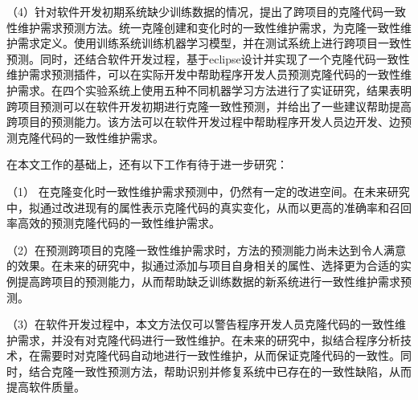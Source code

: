 （4）针对软件开发初期系统缺少训练数据的情况，提出了跨项目的克隆代码一致性维护需求预测方法。统一克隆创建和变化时的一致性维护需求，为克隆一致性维护需求定义。使用训练系统训练机器学习模型，并在测试系统上进行跨项目一致性预测。同时，还结合软件开发过程，基于eclipse设计并实现了一个克隆代码一致性维护需求预测插件，可以在实际开发中帮助程序开发人员预测克隆代码的一致性维护需求。在四个实验系统上使用五种不同机器学习方法进行了实证研究，结果表明跨项目预测可以在软件开发初期进行克隆一致性预测，并给出了一些建议帮助提高跨项目的预测能力。该方法可以在软件开发过程中帮助程序开发人员边开发、边预测克隆代码的一致性维护需求。

在本文工作的基础上，还有以下工作有待于进一步研究：

（1） 在克隆变化时一致性维护需求预测中，仍然有一定的改进空间。在未来研究中，拟通过改进现有的属性表示克隆代码的真实变化，从而以更高的准确率和召回率高效的预测克隆代码的一致性维护需求。

（2）在预测跨项目的克隆一致性维护需求时，方法的预测能力尚未达到令人满意的效果。在未来的研究中，拟通过添加与项目自身相关的属性、选择更为合适的实例提高跨项目的预测能力，从而帮助缺乏训练数据的新系统进行一致性维护需求预测。

（3）在软件开发过程中，本文方法仅可以警告程序开发人员克隆代码的一致性维护需求，并没有对克隆代码进行一致性维护。在未来的研究中，拟结合程序分析技术，在需要时对克隆代码自动地进行一致性维护，从而保证克隆代码的一致性。同时，结合克隆一致性预测方法，帮助识别并修复系统中已存在的一致性缺陷，从而提高软件质量。